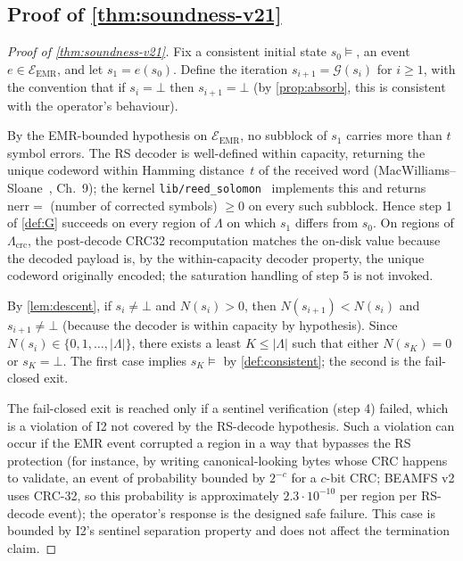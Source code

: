 \subsection{Proof of \cref{thm:soundness-v21}}

\begin{proof}[Proof of \cref{thm:soundness-v21}]
Fix a consistent initial state \(s_0 \models\), an event
\(e \in \mathcal{E}_{\mathrm{EMR}}\), and let \(s_1 = e(s_0)\).
Define the iteration \(s_{i+1} = \mathcal{G}(s_i)\) for
\(i \geq 1\), with the convention that if \(s_i = \bot\) then
\(s_{i+1} = \bot\) (by \cref{prop:absorb}, this is consistent
with the operator's behaviour).

By the EMR-bounded hypothesis on \(\mathcal{E}_{\mathrm{EMR}}\),
no subblock of \(s_1\) carries more than \(t\) symbol errors. The
RS decoder is well-defined within capacity, returning the unique
codeword within Hamming distance~\(t\) of the received word
(MacWilliams--Sloane~\cite{macwilliams1977}, Ch.~9); the kernel
\texttt{lib/reed\_solomon}~\cite{kernelrslib} implements this and
returns \(\mathrm{nerr} = \) (number of corrected symbols) \(\geq 0\)
on every such subblock. Hence step 1 of \cref{def:G} succeeds on
every region of \(\Lambda\) on which \(s_1\) differs from
\(s_0\). On regions of \(\Lambda_{\mathrm{crc}}\), the post-decode
CRC32 recomputation matches the on-disk value because the decoded
payload is, by the within-capacity decoder property, the unique
codeword originally encoded; the saturation handling of step 5 is
not invoked.

By \cref{lem:descent}, if \(s_i \neq \bot\) and \(N(s_i) > 0\),
then \(N(s_{i+1}) < N(s_i)\) and \(s_{i+1} \neq \bot\) (because
the decoder is within capacity by hypothesis). Since
\(N(s_i) \in \{0, 1, \dots, |\Lambda|\}\), there exists a least
\(K \le |\Lambda|\) such that either \(N(s_K) = 0\) or
\(s_K = \bot\). The first case implies \(s_K \models\) by
\cref{def:consistent}; the second is the fail-closed exit.

The fail-closed exit is reached only if a sentinel verification
(step 4) failed, which is a violation of I2 not covered by the
RS-decode hypothesis. Such a violation can occur if the EMR
event corrupted a region in a way that bypasses the RS protection
(for instance, by writing canonical-looking bytes whose CRC
happens to validate, an event of probability bounded by \(2^{-c}\) for a \(c\)-bit
CRC; BEAMFS v2 uses CRC-32, so this probability is approximately
\(2.3 \cdot 10^{-10}\) per region per RS-decode event); the
operator's response is the designed safe failure. This case is bounded by I2's sentinel separation
property and does not affect the termination claim.
\end{proof}

